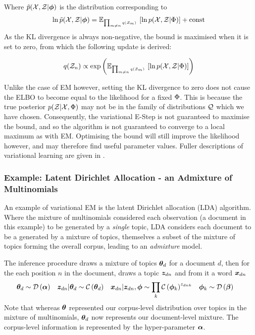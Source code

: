 Where $\tilde{p}({ \mathcal{X} }, { \mathcal{Z} }|{ \bm \phi })$ is the distribution corresponding to
\begin{align}
\ln \tilde{p}({ \mathcal{X} }, { \mathcal{Z} }|{ \bm \phi }) = \mathbb{E}_{ { { \mbox{\tiny ${\prod_{m\neq n} q({ \mathcal{Z} }_m)}$ } } } }\left[ { \ln { p( { \mathcal{X} } ,  { \mathcal{Z} } |  { \Phi } ) } } \right] + \text{const}
\end{align}
As the KL divergence is always non-negative, the bound is maximised when it is set to zero, from which the following update is derived: 

\begin{align}
q({ \mathcal{Z} }_n) \propto \exp\left( { \mathbb{E}_{ { {{ \mbox{\tiny ${\prod_{m\neq n} q({ \mathcal{Z} }_m)}$ } }} } }\left[ { \ln { p( { \mathcal{X} } ,  { \mathcal{Z} } |  { \Phi } ) } } \right] }  \right)
\end{align}

Unlike the case of EM however, setting the KL divergence to zero does not cause the ELBO to become equal to the likelihood for a fixed ${ \Phi }$. This is because the true posterior $p({ \mathcal{Z} } | { \mathcal{X} }, { \Phi })$ may not be in the family of distributions ${ \mathcal{Q} }$ which we have chosen. Consequently, the variational E-Step is not guaranteed to maximise the bound, and so the algorithm is not guaranteed to converge to a local maximum as with EM. Optimising the bound will still improve the likelihood however, and may therefore find useful parameter values. Fuller descriptions of variational learning are given in \cite{Jordan1999a}\cite{Bishop2006}\cite{Tzikas2008}. 


\subsubsection*{Example: Latent Dirichlet Allocation - an Admixture of Multinomials}
\label{sec:chap1:lda}
An example of variational EM is the latent Dirichlet allocation (LDA) algorithm\cite{BleiNgJordan2003}. Where the mixture of multinomials considered each observation (a document in this example) to be generated by a \emph{single} topic, LDA considers each document to be a generated by a mixture of topics, themselves a subset of the mixture of topics forming the overall corpus, leading to an \emph{admixture} model. 

The inference procedure draws a mixture of topics ${ \bm \theta_d }$ for a document $d$, then for the each position $n$ in the document, draws a topic ${ \bm z_{dn} }$ and from it a word ${ \bm x_{dn} }$
\begin{align}
{  \bm \theta _d } & \sim \mathcal{D} \left( {\bm \alpha} \right) &
{ \bm z_{dn} }|{ \bm \theta_d } & \sim \mathcal{C} \left( {{ \bm \theta_d }} \right) & 
{ \bm x_{dn} }|{ \bm z_{dn} }, { \bm \phi } & \sim \prod_k \mathcal{C} \left( {{ \bm \phi }_k} \right)^{{ z_{dnk} }} & 
{ \bm \phi }_k & \sim \mathcal{D} \left( {\bm \beta} \right)
\end{align}
Note that whereas $\bm \theta$ represented our corpus-level distribution over topics in the mixture of multinomials, ${ \bm \theta_d }$ now represents our document-level mixture. The corpus-level information is represented by the hyper-parameter $\bm \alpha$. 

